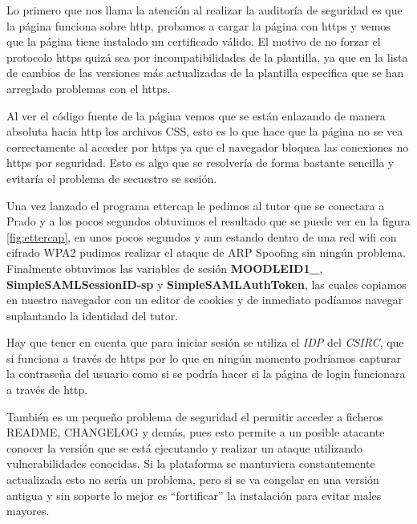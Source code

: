 Lo primero que nos llama la atención al realizar la auditoría de seguridad es que la página funciona sobre http, probamos a cargar la página con https y vemos que la página tiene instalado un certificado válido. El motivo de no forzar el protocolo https quizá sea por incompatibilidades de la plantilla, ya que en la lista de cambios de las versiones más actualizadas de la plantilla especifica que se han arreglado problemas con el https\cite{art_11}.

\bigskip
Al ver el código fuente de la página vemos que se están enlazando de manera absoluta hacia http los archivos CSS, esto es lo que hace que la página no se vea correctamente al acceder por https ya que el navegador bloquea las conexiones no https por seguridad. Esto es algo que se resolvería de forma bastante sencilla y evitaría el problema de secuestro se sesión.

\bigskip
Una vez lanzado el programa ettercap le pedimos al tutor que se conectara a Prado y a los pocos segundos obtuvimos el resultado que se puede ver en la figura \ref{fig:ettercap}, en unos pocos segundos y aun estando dentro de una red wifi con cifrado WPA2 pudimos realizar el ataque de ARP Spoofing sin ningún problema. Finalmente obtuvimos las variables de sesión \textbf{MOODLEID1\_}, \textbf{SimpleSAMLSessionID-sp} y \textbf{SimpleSAMLAuthToken}, las cuales copiamos en nuestro navegador con un editor de cookies y de inmediato podíamos navegar suplantando la identidad del tutor.

\bigskip
Hay que tener en cuenta que para iniciar sesión se utiliza el \textit{IDP} del \textit{CSIRC}, que si funciona a través de https por lo que en ningún momento podríamos capturar la contraseña del usuario como si se podría hacer si la página de login funcionara a través de http.

\bigskip
También es un pequeño problema de seguridad el permitir acceder a ficheros README, CHANGELOG y demás, pues esto permite a un posible atacante conocer la versión que se está ejecutando y realizar un ataque utilizando vulnerabilidades conocidas. Si la plataforma se mantuviera constantemente actualizada esto no sería un problema, pero si se va congelar en una versión antigua y sin soporte lo mejor es ``fortificar'' la instalación para evitar males mayores.

